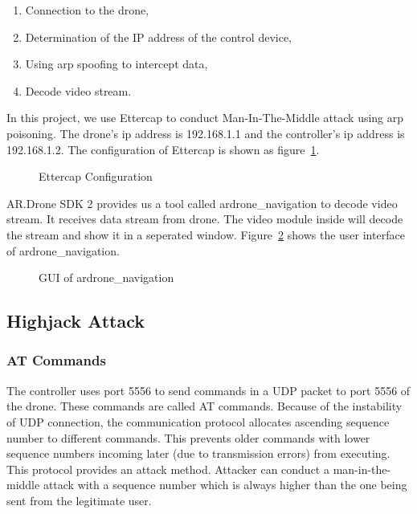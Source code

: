 \documentclass{acm_proc_article-sp}
\newcommand{\upcite}[1]{\textsuperscript{\textsuperscript{\cite{#1}}}}
\begin{document}
\begin{enumerate}
  \item Connection to the drone,
  \item Determination of the IP address of the control device,
  \item Using arp spoofing to intercept data,
  \item Decode video stream.
\end{enumerate}

In this project, we use Ettercap\upcite{ettercap} to conduct Man-In-The-Middle attack using arp poisoning. The drone's ip address is 192.168.1.1 and the controller's ip address is 192.168.1.2. The configuration of Ettercap is shown as figure~\ref{ettercap}.

\begin{figure}
\centering
{}
\caption{Ettercap Configuration}
\label{ettercap}
\end{figure}


AR.Drone SDK 2 \upcite{sdk} provides us a tool called ardrone\_navigation to decode video stream. It receives data stream from drone. The video module inside will decode the stream and show it in a seperated window. Figure~\ref{navigation} shows the user interface of ardrone\_navigation.

\begin{figure}
\centering
{}
\caption{GUI of ardrone\_navigation}
\label{navigation}
\end{figure}


\subsection{Highjack Attack}

\subsubsection{AT Commands}
 The controller uses port 5556 to send commands in a UDP packet to port 5556 of the drone\upcite{dev:guide}. These commands are called AT commands. Because of the instability of UDP connection, the communication protocol allocates ascending sequence number to different commands. This prevents older commands with lower sequence numbers incoming later (due to transmission errors) from executing\upcite{hack:secure}. This protocol provides an attack method. Attacker can conduct a man-in-the-middle attack with a sequence number which is always higher than the one being sent from the legitimate user.
\end{document}

